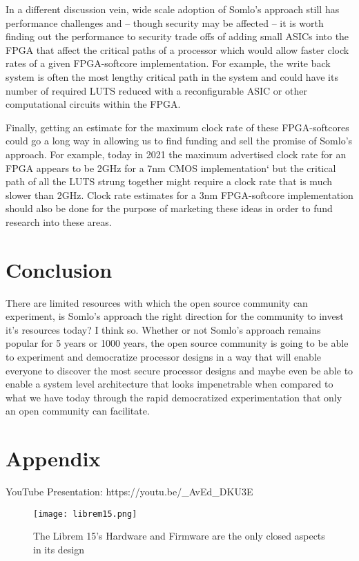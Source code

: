 \documentclass[conference]{IEEEtran}
\begin{document}
In a different discussion vein, wide scale adoption of Somlo’s approach still has performance challenges and – though security may be affected – it is worth finding out the performance to security trade offs of adding small ASICs into the FPGA that affect the critical paths of a processor which would allow faster clock rates of a given FPGA-softcore implementation. For example, the write back system is often the most lengthy critical path in the system and could have its number of required LUTS reduced with a reconfigurable ASIC or other computational circuits within the FPGA.

Finally, getting an estimate for the maximum clock rate of these FPGA-softcores could go a long way in allowing us to find funding and sell the promise of Somlo’s approach. For example, today in 2021 the maximum advertised clock rate for an FPGA appears to be 2GHz for a 7nm CMOS implementation`\cite{speedster} but the critical path of all the LUTS strung together might require a clock rate that is much slower than 2GHz. Clock rate estimates for a 3nm FPGA-softcore implementation should also be done for the purpose of marketing these ideas  in order to fund research into these areas.

\section{Conclusion}

There are limited resources with which the open source community can experiment, is Somlo’s approach the right direction for the community to invest it’s resources today? I think so. Whether or not Somlo’s approach remains popular for 5 years or 1000 years, the open source community is going to be able to experiment and democratize processor designs in a way that will enable everyone to discover the most secure processor designs and maybe even be able to enable a system level architecture that looks impenetrable when compared to what we have today through the rapid democratized experimentation that only an open community can facilitate.




\section*{Appendix}

YouTube Presentation:
https://youtu.be/\_AvEd\_DKU3E

\begin{figure*}
\centering
\texttt{[image: librem15.png]}
\caption{The Librem 15's Hardware and Firmware are the only closed aspects in its design~\cite{bunnie}}
\end{figure*}
\end{document}
